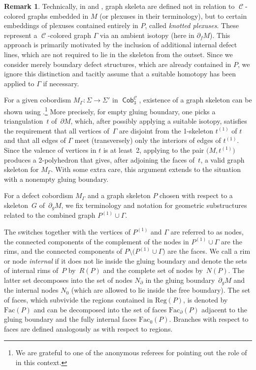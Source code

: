 \documentclass[pdftex]{sigma}
\DeclareMathOperator{\Cob}{\mathsf{Cob}}
\DeclareMathOperator{\calc}{\mathcal{C}}
\numberwithin{equation}{section}
\theoremstyle{definition}
\newtheorem{Remark}[Remark]{Remark}
\begin{document}
\begin{Remark}
 Technically, in \cite{F} and \cite{TV}, graph skeleta are defined not in relation to $\calc$-colored graphs embedded in $M$ (or plexuses in their terminology), but to certain embeddings of plexuses contained entirely in $P$, called \textit{knotted plexuses}. These represent a $\calc$-colored graph $\Gamma$ via an ambient isotopy (here in $\partial_f M$). This approach is primarily motivated by the inclusion of additional internal defect lines, which are not required to lie in the skeleton from the outset. Since we consider merely boundary defect structures, which are already contained in $P$, we ignore this distinction and tacitly assume that a suitable homotopy has been applied to $\Gamma$ if necessary.
\end{Remark}
For a given cobordism $M_{\Gamma} \colon \Sigma \to \Sigma'$ in $\Cob_3^{\calc}$, existence of a graph skeleton can be shown using
\cite[Theorem 11.5]{TV}.\footnote{We are grateful to one of the anonymous referees for pointing out
the role of \cite[Theorem 11.5]{TV} in this context.}
More precisely, for empty gluing boundary, one picks a triangulation~$t$ of~$\partial M$, which, after possibly applying a suitable isotopy, satisfies the requirement that all vertices of~$\Gamma$ are disjoint from the 1-skeleton $t^{(1)}$ of $t$ and that all edges of $\Gamma$ meet (transversely) only the interiors of edges of $t^{(1)}$. Since the valence of vertices in $t$ is at least~2, applying \cite[Theorem~11.5]{TV} to the pair $\bigl(M, t^{(1)}\bigr)$ produces a 2-polyhedron that gives, after adjoining the faces of~$t$, a valid graph skeleton for $M_{\Gamma}$. With some extra care, this argument extends to the situation with a nonempty gluing boundary.

For a defect cobordism $M_{\Gamma}$ and a graph skeleton $P$ chosen with respect to a skeleton~$G$ of~$\partial_gM$, we fix terminology and notation for geometric substructures related to the combined graph $P^{(1)} \cup \Gamma$.

The switches together with the vertices of $P^{(1)}$ and $\Gamma$ are referred to as nodes, the connected components of the complement of the nodes in $P^{(1)} \cup \Gamma$ are the rims, and the connected components of $P \setminus \bigl(P^{(1)} \cup \Gamma\bigr)$ are the faces. We call a rim or node \textit{internal} if it does not lie inside the gluing boundary and denote the sets of internal rims of~$P$ by~$R(P)$ and the complete set of nodes by~$N(P)$. The latter set decomposes into the set of nodes $N_{\partial}$ in the gluing boundary~$\partial_gM$ and the internal nodes $N_0$ (which are allowed to lie inside the free boundary). The set of faces, which subvivide the regions contained in $\mathrm{Reg}(P)$, is denoted by $\mathrm{Fac}(P)$ and can be decomposed into the set of faces $\mathrm{Fac}_{\partial}(P)$ adjacent to the gluing boundary and the fully internal faces $\mathrm{Fac}_0(P)$. Branches with respect to faces are defined analogously as with respect to regions.
\end{document}
